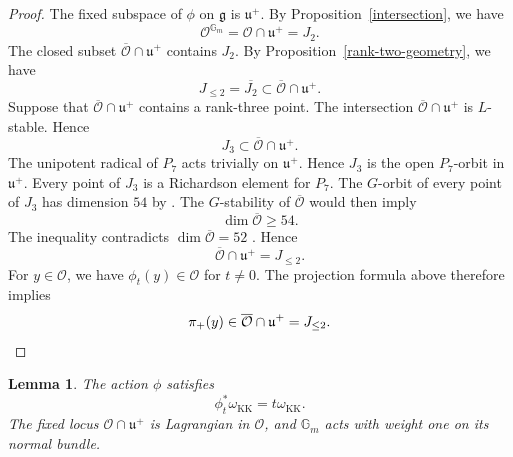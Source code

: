 \documentclass[12pt]{article}
\newtheorem{lemma}[theorem]{Lemma}
\theoremstyle{definition}
\begin{document}
\begin{proof}
The fixed subspace of \(\phi\) on \(\mathfrak g\) is \(\mathfrak u^+\).
By Proposition~\ref{intersection}, we have
\[
    \mathcal O^{\mathbb G_m}=\mathcal O\cap\mathfrak u^+=J_2.
\]
The closed subset \(\overline{\mathcal O}\cap\mathfrak u^+\) contains \(J_2\).
By Proposition~\ref{rank-two-geometry}, we have
\[
    J_{\leq2}=\overline{J_2}
    \subset\overline{\mathcal O}\cap\mathfrak u^+.
\]
Suppose that \(\overline{\mathcal O}\cap\mathfrak u^+\) contains a rank-three
point. The intersection \(\overline{\mathcal O}\cap\mathfrak u^+\) is
\(L\)-stable. Hence
\[
    J_3\subset\overline{\mathcal O}\cap\mathfrak u^+.
\]
The unipotent radical of \(P_7\) acts trivially on \(\mathfrak u^+\).
Hence \(J_3\) is the open \(P_7\)-orbit in \(\mathfrak u^+\). Every point
of \(J_3\) is a Richardson element for \(P_7\). The \(G\)-orbit of every point of \(J_3\)
has dimension \(54\) by \cite[Theorem~7.1.1]{CM}. The \(G\)-stability of
\(\overline{\mathcal O}\) would then imply
\[
    \dim\overline{\mathcal O}\geq54.
\]
The inequality contradicts \(\dim\overline{\mathcal O}=52\)
\cite[Section~8.4]{CM}. Hence
\[
    \overline{\mathcal O}\cap\mathfrak u^+=J_{\leq2}.
\]
For \(y\in\mathcal O\), we have \(\phi_t(y)\in\mathcal O\) for \(t\ne0\). The
projection formula above therefore implies
\[
    \pi_+(y)\in\overline{\mathcal O}\cap\mathfrak u^+=J_{\leq2}.
    \qedhere
\]
\end{proof}

\begin{lemma}\label{symplectic-weights}
The action \(\phi\) satisfies
\[
    \phi_t^*\omega_{\mathrm{KK}}=t\omega_{\mathrm{KK}}.
\]
The fixed locus \(\mathcal O\cap\mathfrak u^+\) is Lagrangian in \(\mathcal O\), and
\(\mathbb G_m\) acts with weight one on its normal bundle.
\end{lemma}
\end{document}

